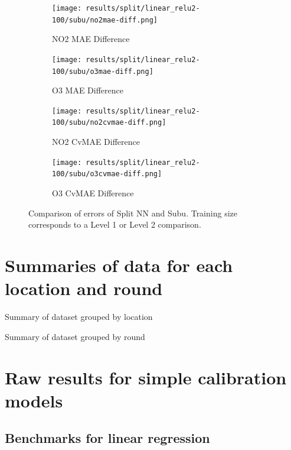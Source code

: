 \documentclass[journal abbreviation, manuscript]{copernicus}
\begin{document}
\begin{figure}[H]
\begin{subfigure}{0.49\textwidth}
\texttt{[image: results/split/linear\_relu2-100/subu/no2mae-diff.png]}
\caption{NO2 MAE Difference}
\end{subfigure}
\begin{subfigure}{0.49\textwidth}
\texttt{[image: results/split/linear\_relu2-100/subu/o3mae-diff.png]}
\caption{O3 MAE Difference}
\end{subfigure}
\begin{subfigure}{0.49\textwidth}
\texttt{[image: results/split/linear\_relu2-100/subu/no2cvmae-diff.png]}
\caption{NO2 CvMAE Difference}
\end{subfigure}
\begin{subfigure}{0.49\textwidth}
\texttt{[image: results/split/linear\_relu2-100/subu/o3cvmae-diff.png]}
\caption{O3 CvMAE Difference}
\end{subfigure}
\caption{Comparison of errors of Split NN and Subu. Training size corresponds to a Level 1 or Level 2 comparison.}
\end{figure}

\renewcommand{\thetable}{\Alph{section}.\arabic{table}}

\section{Summaries of data for each location and round}
\label{sec:summaryresults}

\begin{table}[H]
\scriptsize

\caption{Summary of dataset grouped by location}
\end{table}

\begin{table}[H]
\scriptsize

\caption{Summary of dataset grouped by round}
\end{table}

\section{Raw results for simple calibration models}
\label{sec:simpleresults}

\subsection{Benchmarks for linear regression}
\label{sec:results-lr}
\end{document}
